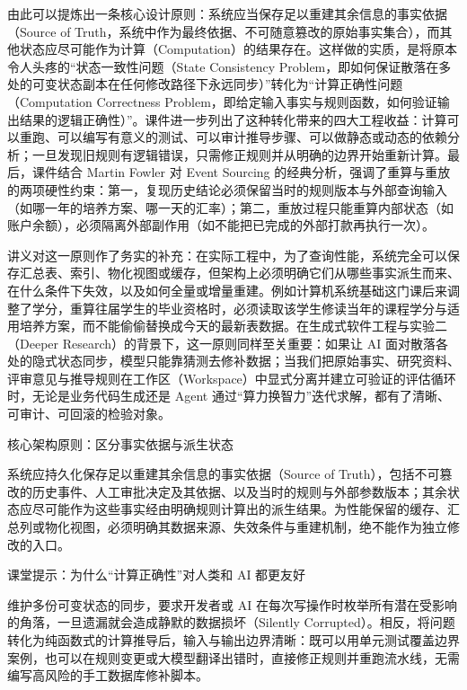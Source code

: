 \documentclass[UTF8,a4paper,11pt,fontset=fandol]{ctexart}
\begin{document}
由此可以提炼出一条核心设计原则：系统应当保存足以重建其余信息的事实依据（Source of Truth，系统中作为最终依据、不可随意篡改的原始事实集合），而其他状态应尽可能作为计算（Computation）的结果存在。这样做的实质，是将原本令人头疼的“状态一致性问题（State Consistency Problem，即如何保证散落在多处的可变状态副本在任何修改路径下永远同步）”转化为“计算正确性问题（Computation Correctness Problem，即给定输入事实与规则函数，如何验证输出结果的逻辑正确性）”。课件进一步列出了这种转化带来的四大工程收益：计算可以重跑、可以编写有意义的测试、可以审计推导步骤、可以做静态或动态的依赖分析；一旦发现旧规则有逻辑错误，只需修正规则并从明确的边界开始重新计算。最后，课件结合 Martin Fowler 对 Event Sourcing 的经典分析，强调了重算与重放的两项硬性约束：第一，复现历史结论必须保留当时的规则版本与外部查询输入（如哪一年的培养方案、哪一天的汇率）；第二，重放过程只能重算内部状态（如账户余额），必须隔离外部副作用（如不能把已完成的外部打款再执行一次）。

讲义对这一原则作了务实的补充：在实际工程中，为了查询性能，系统完全可以保存汇总表、索引、物化视图或缓存，但架构上必须明确它们从哪些事实派生而来、在什么条件下失效，以及如何全量或增量重建。例如计算机系统基础这门课后来调整了学分，重算往届学生的毕业资格时，必须读取该学生修读当年的课程学分与适用培养方案，而不能偷偷替换成今天的最新表数据。在生成式软件工程与实验二（Deeper Research）的背景下，这一原则同样至关重要：如果让 AI 面对散落各处的隐式状态同步，模型只能靠猜测去修补数据；当我们把原始事实、研究资料、评审意见与推导规则在工作区（Workspace）中显式分离并建立可验证的评估循环时，无论是业务代码生成还是 Agent 通过“算力换智力”迭代求解，都有了清晰、可审计、可回滚的检验对象。

\begin{importantbox}{核心架构原则：区分事实依据与派生状态}

系统应持久化保存足以重建其余信息的事实依据（Source of Truth），包括不可篡改的历史事件、人工审批决定及其依据、以及当时的规则与外部参数版本；其余状态应尽可能作为这些事实经由明确规则计算出的派生结果。为性能保留的缓存、汇总列或物化视图，必须明确其数据来源、失效条件与重建机制，绝不能作为独立修改的入口。

\end{importantbox}

\begin{knowledgebox}{课堂提示：为什么“计算正确性”对人类和 AI 都更友好}

维护多份可变状态的同步，要求开发者或 AI 在每次写操作时枚举所有潜在受影响的角落，一旦遗漏就会造成静默的数据损坏（Silently Corrupted）。相反，将问题转化为纯函数式的计算推导后，输入与输出边界清晰：既可以用单元测试覆盖边界案例，也可以在规则变更或大模型翻译出错时，直接修正规则并重跑流水线，无需编写高风险的手工数据库修补脚本。

\end{knowledgebox}
\end{document}
